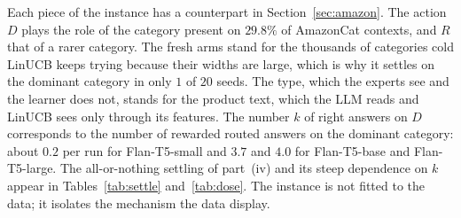 \documentclass[anon]{alt2027} %
\begin{document}
\begin{remark}
\label{rem:transfer-amazon}
Each piece of the instance has a counterpart in Section~\ref{sec:amazon}.
The action $D$ plays the role of the category present on $29.8\%$ of
AmazonCat contexts, and $R$ that of a rarer category. The fresh arms stand for
the thousands of categories cold LinUCB keeps trying because their widths
are large, which is why it settles on the dominant category in only $1$ of
$20$ seeds. The type, which the experts see and the learner does not, stands
for the product text, which the LLM reads and LinUCB sees only through its
features. The number $k$ of right answers on $D$ corresponds to the number
of rewarded routed answers on the dominant category: about $0.2$ per run for
Flan-T5-small and $3.7$ and $4.0$ for Flan-T5-base and Flan-T5-large. The
all-or-nothing settling of part~(iv) and its steep dependence on $k$ appear
in Tables~\ref{tab:settle} and~\ref{tab:dose}. The instance is not fitted to
the data; it isolates the mechanism the data display.
\end{remark}
\end{document}
